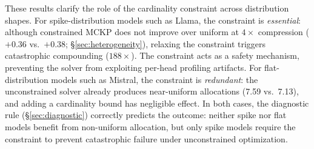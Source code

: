 These results clarify the role of the cardinality constraint across distribution shapes.
For spike-distribution models such as Llama, the constraint is \emph{essential}: although constrained MCKP does not improve over uniform at $4\times$ compression ($+$0.36 vs.\ $+$0.38; \S\ref{sec:heterogeneity}), relaxing the constraint triggers catastrophic compounding ($188\times$).
The constraint acts as a safety mechanism, preventing the solver from exploiting per-head profiling artifacts.
For flat-distribution models such as Mistral, the constraint is \emph{redundant}: the unconstrained solver already produces near-uniform allocations (7.59 vs.\ 7.13), and adding a cardinality bound has negligible effect.
In both cases, the diagnostic rule (\S\ref{sec:diagnostic}) correctly predicts the outcome: neither spike nor flat models benefit from non-uniform allocation, but only spike models require the constraint to prevent catastrophic failure under unconstrained optimization.
